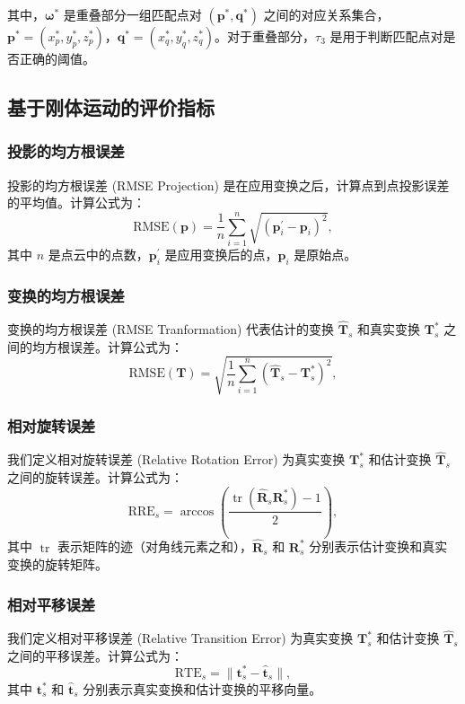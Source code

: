 其中，$\boldsymbol{\omega}^*$ 是重叠部分一组匹配点对 $(\boldsymbol{p}^*, \boldsymbol{q}^*)$ 之间的对应关系集合，$\boldsymbol{p}^* = (x^*_p, y^*_p, z^*_p)$，$\boldsymbol{q}^* = (x^*_q, y^*_q, z^*_q)$。对于重叠部分，$\tau_3$ 是用于判断匹配点对是否正确的阈值。

\subsection{基于刚体运动的评价指标}
\subsubsection{投影的均方根误差}
投影的均方根误差 (RMSE Projection) 是在应用变换之后，计算点到点投影误差的平均值。计算公式为：
\begin{equation}
    \text{RMSE} (\boldsymbol{p}) = \frac{1}{n}\sum_{i=1}^{n} \sqrt{(\boldsymbol{p}_i^{'} - \boldsymbol{p}_i)^2},
\end{equation}
其中 $n$ 是点云中的点数，$\boldsymbol{p}_i^{'}$ 是应用变换后的点，$\boldsymbol{p}_i$ 是原始点。

\subsubsection{变换的均方根误差}
变换的均方根误差 (RMSE Tranformation) 代表估计的变换 $\boldsymbol{\hat{T}}_{s}$ 和真实变换 $\boldsymbol{T}^*_{s}$ 之间的均方根误差。计算公式为：
\begin{equation}
    \text{RMSE} (\boldsymbol{T}) = \sqrt{\frac{1}{n}\sum_{i=1}^{n}(\boldsymbol{\hat{T}}_{s} - \boldsymbol{T}^*_{s})^2},
\end{equation}

\subsubsection{相对旋转误差}
我们定义相对旋转误差 (Relative Rotation Error) 为真实变换 $\boldsymbol{T}^*_{s}$ 和估计变换 $\boldsymbol{\hat{T}}_{s}$ 之间的旋转误差。计算公式为：
\begin{equation}
    \text{RRE}_s = \arccos \left(\frac{\operatorname{tr}(\boldsymbol{\hat{R}}_{s} \boldsymbol{R}^*_s) - 1}{2}\right),
\end{equation}
其中 $\operatorname{tr}$ 表示矩阵的迹（对角线元素之和），$\boldsymbol{\hat{R}}_{s}$ 和 $\boldsymbol{R}^*_s$ 分别表示估计变换和真实变换的旋转矩阵。

\subsubsection{相对平移误差}
我们定义相对平移误差 (Relative Transition Error) 为真实变换 $\boldsymbol{T}^*_s$ 和估计变换 $\boldsymbol{\hat{T}}_{s}$ 之间的平移误差。计算公式为：
\begin{equation}
    \text{RTE}_s = \lVert \boldsymbol{t}^*_s - \boldsymbol{\hat{t}}_{s} \rVert,
\end{equation}
其中 $\boldsymbol{t}^*_s$ 和 $\boldsymbol{\hat{t}}_{s}$ 分别表示真实变换和估计变换的平移向量。

